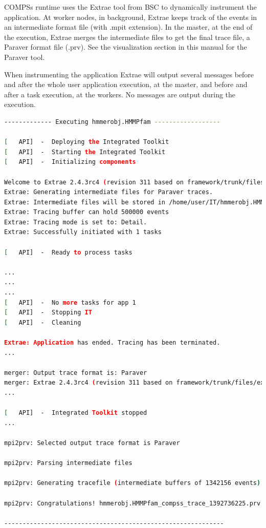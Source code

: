 COMPSs runtime uses the Extrae tool from BSC to dynamically instrument the application. At worker nodes, in background, Extrae keeps track of the events in an intermediate format file (with .mpit extension). In the master, at the end of the execution, Extrae merges the intermediate files to get the final trace file, a Paraver format file (.prv). See the visualization section in this manual for the Paraver tool.

When instrumenting the application Extrae will output several messages before and after the whole user application execution, at the master, and before and after a task execution, at the workers. No messages are output during the execution.

\begin{lstlisting}[language=bash]
------------- Executing hmmerobj.HMMPfam ------------------

[   API]  -  Deploying the Integrated Toolkit
[   API]  -  Starting the Integrated Toolkit
[   API]  -  Initializing components

Welcome to Extrae 2.4.3rc4 (revision 311 based on framework/trunk/files/extrae)
Extrae: Generating intermediate files for Paraver traces.
Extrae: Intermediate files will be stored in /home/user/IT/hmmerobj.HMMPfam
Extrae: Tracing buffer can hold 500000 events
Extrae: Tracing mode is set to: Detail.
Extrae: Successfully initiated with 1 tasks

[   API]  -  Ready to process tasks

...
...
...
[   API]  -  No more tasks for app 1
[   API]  -  Stopping IT
[   API]  -  Cleaning

Extrae: Application has ended. Tracing has been terminated.
...

merger: Output trace format is: Paraver
merger: Extrae 2.4.3rc4 (revision 311 based on framework/trunk/files/extrae)
...

[   API]  -  Integrated Toolkit stopped
...

mpi2prv: Selected output trace format is Paraver

mpi2prv: Parsing intermediate files

mpi2prv: Generating tracefile (intermediate buffers of 1342156 events)

mpi2prv: Congratulations! hmmerobj.HMMPfam_compss_trace_1392736225.prv has been generated.

------------------------------------------------------------
\end{lstlisting}

